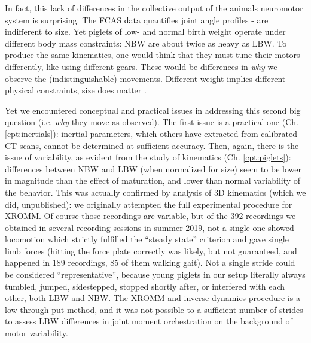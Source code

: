 In fact, this lack of differences in the collective output of the animals neuromotor system is surprising.
The FCAS data quantifies joint angle profiles -  are indifferent to size.
Yet piglets of low- and normal birth weight operate under different body mass constraints: NBW are about twice as heavy as LBW.
To produce the same kinematics, one would think that they must tune their motors differently, like using different gears.
These would be differences in \emph{why} we observe the (indistinguishable) movements.
Different weight implies different physical constraints, size does matter \citep{Aerts2023}.

Yet we encountered conceptual and practical issues in addressing this second big question (i.e. \emph{why} they move as observed).
The first issue is a practical one (Ch. \ref{cpt:inertials}): inertial parameters, which others have extracted from calibrated CT scans, cannot be determined at sufficient accuracy.
Then, again, there is the issue of variability, as evident from the study of kinematics (Ch. \ref{cpt:piglets}):
differences between NBW and LBW (when normalized for size) seem to be lower in magnitude than the effect of maturation, and lower than normal variability of the behavior.
This was actually confirmed by analysis of 3D kinematics (which we did, unpublished): we originally attempted the full experimental procedure for XROMM.
Of course those recordings are variable, but of the 392 recordings we obtained in several recording sessions in summer 2019, not a single one showed locomotion which strictly fulfilled the ``steady state'' criterion and gave single limb forces (hitting the force plate correctly was likely, but not guaranteed, and happened in 189 recordings, 85 of them walking gait).
Not a single stride could be considered ``representative'', because young piglets in our setup literally always tumbled, jumped, sidestepped, stopped shortly after, or interfered with each other, both LBW and NBW.
The XROMM and inverse dynamics procedure is a low through-put method, and it was not possible to  a sufficient number of strides to assess LBW differences in joint moment orchestration on the background of motor variability.


